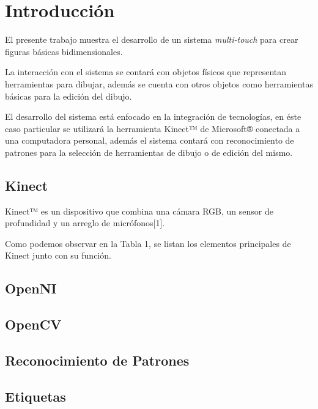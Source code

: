 
\chapter{Introducción}

El presente trabajo muestra el desarrollo de un sistema {\it multi-touch} %
 para crear figuras básicas bidimensionales.

La interacción con el sistema se contará con objetos físicos que representan herramientas para dibujar, además se cuenta con otros objetos como herramientas básicas para la edición del dibujo. 


El desarrollo del sistema está enfocado en la integración de tecnologías, 
en éste caso particular se utilizará la herramienta Kinect™ de Microsoft® conectada a una computadora personal, 
además el sistema contará con reconocimiento de patrones para la selección de herramientas de dibujo o de edición del mismo.

\section{Kinect}

Kinect™ es un dispositivo que combina una cámara RGB, un sensor de profundidad y un arreglo de micrófonos[1].

Como podemos observar en la Tabla 1, se listan los elementos principales de Kinect junto con su función.

\section{OpenNI}

\section{OpenCV}

\section{Reconocimiento de Patrones}

\section{Etiquetas} %

